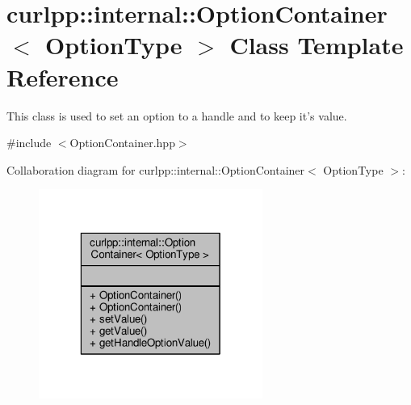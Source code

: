 \hypertarget{classcurlpp_1_1internal_1_1OptionContainer}{\section{curlpp\-:\-:internal\-:\-:Option\-Container$<$ Option\-Type $>$ Class Template Reference}
\label{classcurlpp_1_1internal_1_1OptionContainer}
}


This class is used to set an option to a handle and to keep it's value.  




{\ttfamily \#include $<$Option\-Container.\-hpp$>$}



Collaboration diagram for curlpp\-:\-:internal\-:\-:Option\-Container$<$ Option\-Type $>$\-:\nopagebreak
\begin{figure}[H]
\begin{center}
\leavevmode
\includegraphics[width=208pt]{classcurlpp_1_1internal_1_1OptionContainer__coll__graph}
\end{center}
\end{figure}
